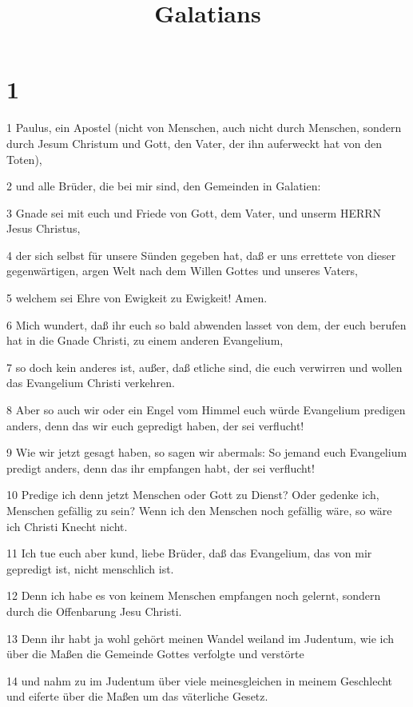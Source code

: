 

\title{Galatians}


\chapter{1}

\par 1 Paulus, ein Apostel (nicht von Menschen, auch nicht durch Menschen, sondern durch Jesum Christum und Gott, den Vater, der ihn auferweckt hat von den Toten),
\par 2 und alle Brüder, die bei mir sind, den Gemeinden in Galatien:
\par 3 Gnade sei mit euch und Friede von Gott, dem Vater, und unserm HERRN Jesus Christus,
\par 4 der sich selbst für unsere Sünden gegeben hat, daß er uns errettete von dieser gegenwärtigen, argen Welt nach dem Willen Gottes und unseres Vaters,
\par 5 welchem sei Ehre von Ewigkeit zu Ewigkeit! Amen.
\par 6 Mich wundert, daß ihr euch so bald abwenden lasset von dem, der euch berufen hat in die Gnade Christi, zu einem anderen Evangelium,
\par 7 so doch kein anderes ist, außer, daß etliche sind, die euch verwirren und wollen das Evangelium Christi verkehren.
\par 8 Aber so auch wir oder ein Engel vom Himmel euch würde Evangelium predigen anders, denn das wir euch gepredigt haben, der sei verflucht!
\par 9 Wie wir jetzt gesagt haben, so sagen wir abermals: So jemand euch Evangelium predigt anders, denn das ihr empfangen habt, der sei verflucht!
\par 10 Predige ich denn jetzt Menschen oder Gott zu Dienst? Oder gedenke ich, Menschen gefällig zu sein? Wenn ich den Menschen noch gefällig wäre, so wäre ich Christi Knecht nicht.
\par 11 Ich tue euch aber kund, liebe Brüder, daß das Evangelium, das von mir gepredigt ist, nicht menschlich ist.
\par 12 Denn ich habe es von keinem Menschen empfangen noch gelernt, sondern durch die Offenbarung Jesu Christi.
\par 13 Denn ihr habt ja wohl gehört meinen Wandel weiland im Judentum, wie ich über die Maßen die Gemeinde Gottes verfolgte und verstörte
\par 14 und nahm zu im Judentum über viele meinesgleichen in meinem Geschlecht und eiferte über die Maßen um das väterliche Gesetz.
